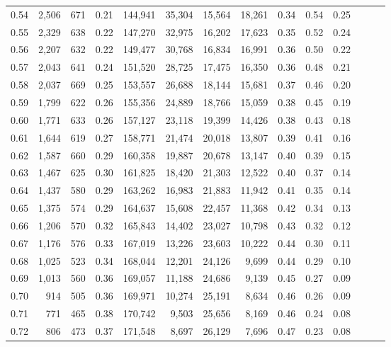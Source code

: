 \begin{tabular}{rrrrrrrrrrrrrr}
0.54 &  2,506 &  671 &  0.21 &  144,941 &   35,304 &  15,564 &  18,261 &  0.34 &  0.54 &      0.25 \\
0.55 &  2,329 &  638 &  0.22 &  147,270 &   32,975 &  16,202 &  17,623 &  0.35 &  0.52 &      0.24 \\
0.56 &  2,207 &  632 &  0.22 &  149,477 &   30,768 &  16,834 &  16,991 &  0.36 &  0.50 &      0.22 \\
0.57 &  2,043 &  641 &  0.24 &  151,520 &   28,725 &  17,475 &  16,350 &  0.36 &  0.48 &      0.21 \\
0.58 &  2,037 &  669 &  0.25 &  153,557 &   26,688 &  18,144 &  15,681 &  0.37 &  0.46 &      0.20 \\
0.59 &  1,799 &  622 &  0.26 &  155,356 &   24,889 &  18,766 &  15,059 &  0.38 &  0.45 &      0.19 \\
0.60 &  1,771 &  633 &  0.26 &  157,127 &   23,118 &  19,399 &  14,426 &  0.38 &  0.43 &      0.18 \\
0.61 &  1,644 &  619 &  0.27 &  158,771 &   21,474 &  20,018 &  13,807 &  0.39 &  0.41 &      0.16 \\
0.62 &  1,587 &  660 &  0.29 &  160,358 &   19,887 &  20,678 &  13,147 &  0.40 &  0.39 &      0.15 \\
0.63 &  1,467 &  625 &  0.30 &  161,825 &   18,420 &  21,303 &  12,522 &  0.40 &  0.37 &      0.14 \\
0.64 &  1,437 &  580 &  0.29 &  163,262 &   16,983 &  21,883 &  11,942 &  0.41 &  0.35 &      0.14 \\
0.65 &  1,375 &  574 &  0.29 &  164,637 &   15,608 &  22,457 &  11,368 &  0.42 &  0.34 &      0.13 \\
0.66 &  1,206 &  570 &  0.32 &  165,843 &   14,402 &  23,027 &  10,798 &  0.43 &  0.32 &      0.12 \\
0.67 &  1,176 &  576 &  0.33 &  167,019 &   13,226 &  23,603 &  10,222 &  0.44 &  0.30 &      0.11 \\
0.68 &  1,025 &  523 &  0.34 &  168,044 &   12,201 &  24,126 &   9,699 &  0.44 &  0.29 &      0.10 \\
0.69 &  1,013 &  560 &  0.36 &  169,057 &   11,188 &  24,686 &   9,139 &  0.45 &  0.27 &      0.09 \\
0.70 &    914 &  505 &  0.36 &  169,971 &   10,274 &  25,191 &   8,634 &  0.46 &  0.26 &      0.09 \\
0.71 &    771 &  465 &  0.38 &  170,742 &    9,503 &  25,656 &   8,169 &  0.46 &  0.24 &      0.08 \\
0.72 &    806 &  473 &  0.37 &  171,548 &    8,697 &  26,129 &   7,696 &  0.47 &  0.23 &      0.08 \\

\end{tabular}
